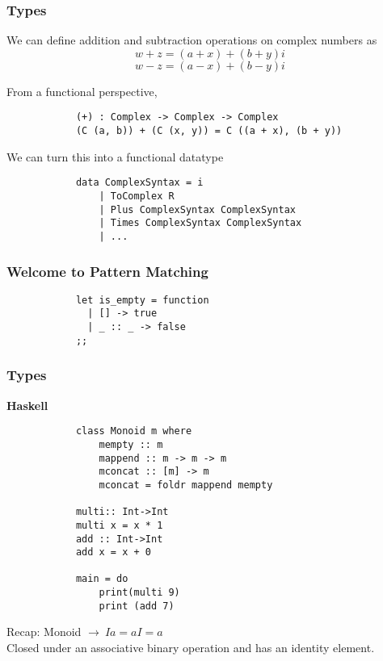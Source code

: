 \documentclass[handout]{beamer}
\begin{document}
    \begin{frame}[fragile]
        \frametitle{Types}

        We can define addition and subtraction operations on complex numbers as
        $$w + z = (a + x) + (b + y) i$$
        \vspace{-20px}
        $$w - z = (a - x) + (b - y) i$$

        From a functional perspective,
        \begin{verbatim}
            (+) : Complex -> Complex -> Complex
            (C (a, b)) + (C (x, y)) = C ((a + x), (b + y))
        \end{verbatim}

        \vspace{-10px}

        We can turn this into a functional datatype
        \scriptsize
        \begin{verbatim}
            data ComplexSyntax = i
                | ToComplex R
                | Plus ComplexSyntax ComplexSyntax
                | Times ComplexSyntax ComplexSyntax
                | ...
        \end{verbatim}

    \end{frame}

    \begin{frame}[fragile]
        \frametitle{Welcome to Pattern Matching}

        \begin{verbatim}
            let is_empty = function
              | [] -> true
              | _ :: _ -> false
            ;;
        \end{verbatim}
    \end{frame}

    \begin{frame}[fragile]
        \frametitle{Types}
        \textbf{Haskell}
        \vspace{-10px}
        \scriptsize
        \begin{verbatim}
            class Monoid m where
                mempty :: m
                mappend :: m -> m -> m
                mconcat :: [m] -> m
                mconcat = foldr mappend mempty

            multi:: Int->Int
            multi x = x * 1
            add :: Int->Int
            add x = x + 0

            main = do
                print(multi 9)
                print (add 7)
        \end{verbatim}
        \vspace{-10px}
        Recap: Monoid $\rightarrow\ Ia = aI = a$ \\
        Closed under an associative binary operation and has an identity element.
    \end{frame}
\end{document}
